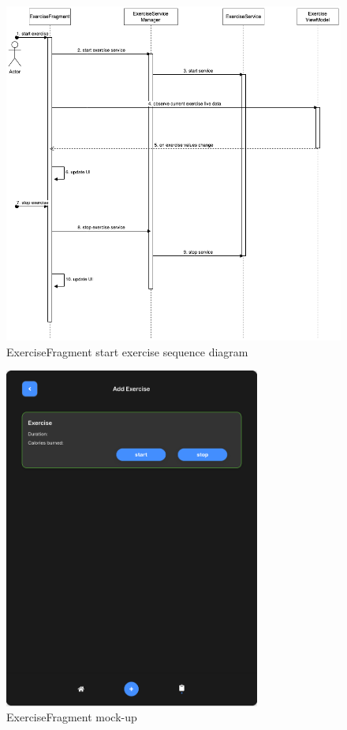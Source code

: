 \begin{figure}[H]
    \centering
    \includegraphics[width=1\textwidth]{diagrams/start-ex-frag.drawio.png}
    \caption{ExerciseFragment start exercise sequence diagram}
    \label{fig:exercisefragment_start_diagram}
\end{figure}


\begin{figure}[H]
    \centering
    \includegraphics[width=0.75\textwidth]{images/exercise-fragment-mockup.png}
    \caption{ExerciseFragment mock-up}
    \label{fig:exercisefragment_mockup}
\end{figure}

